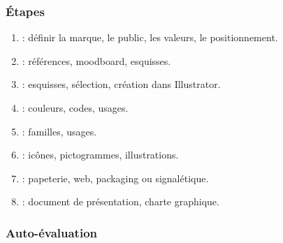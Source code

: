 \subsubsection*{Étapes}

\begin{enumerate}
    \item {} : définir la marque, le public, les valeurs, le positionnement.
    \item {} : références, moodboard, esquisses.
    \item {} : esquisses, sélection, création dans Illustrator.
    \item {} : couleurs, codes, usages.
    \item {} : familles, usages.
    \item {} : icônes, pictogrammes, illustrations.
    \item {} : papeterie, web, packaging ou signalétique.
    \item {} : document de présentation, charte graphique.
\end{enumerate}

\subsubsection*{Auto-évaluation}

